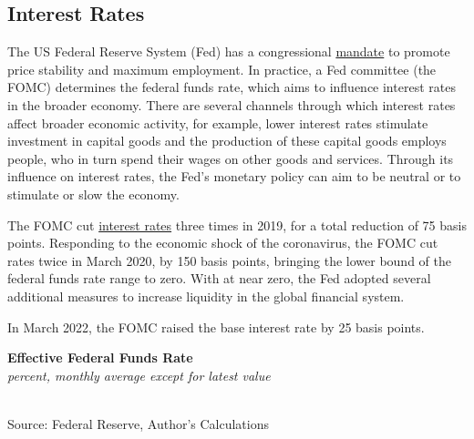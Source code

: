 \documentclass{report}
\makeatletter
\newcommand{\tbllink}[1]{\href{https://raw.githubusercontent.com/bdecon/US-chartbook/master/chartbook/data/#1}{\faTable}}
\newcommand*\short[1]{\expandafter\@gobbletwo\number\numexpr#1\relax}
\newcommand{\absnode}[3]{\node[below right, align=left] at (axis cs: #1,#2) {#3};}
\newcommand{\dateaxisticks}{
		date coordinates in=x, axis line style={draw=none},
		xmax={2022-03-15},
		max space between ticks=40,	    
		xtick={{1990-01-01}, {1992-01-01}, {1994-01-01}, 
			{1996-01-01}, {1998-01-01}, {2000-01-01}, 
			{2002-01-01}, {2004-01-01}, {2006-01-01},
			{2008-01-01}, {2010-01-01}, {2012-01-01}, {2014-01-01},
		    {2016-01-01}, {2018-01-01}, {2020-01-01}, {2022-01-01}, 
		    {2024-01-01}, {2026-01-01}},
		minor xtick={{1989-01-01}, {1991-01-01}, {1993-01-01},
			{1995-01-01}, {1997-01-01}, {1999-01-01}, 
			{2001-01-01}, {2003-01-01}, {2005-01-01}, {2007-01-01},
		    {2009-01-01}, {2011-01-01}, {2013-01-01}, {2015-01-01},
		    {2017-01-01}, {2019-01-01}, {2021-01-01}, {2023-01-01}, 
		    {2025-01-01}, {2027-01-01}},
		enlarge y limits={0.06}, enlarge x limits={0.01},
		}
\newcommand{\bbar}[2]{extra #1 ticks = {{#2}}, extra #1 tick labels = ,
		extra #1 tick style = {grid=major, grid style={thick, black!25}},}
\newcommand{\stdline}[4]{\addplot[very thick, no markers, color=#1] 
		table [x=#2, y=#3, col sep=comma] {#4};	}
\newcommand{\thickline}[4]{\addplot[ultra thick, no markers, color=#1] 
		table [x=#2, y=#3, col sep=comma] {#4};	}
\newcommand{\rbars}{
		\fill[color=black!10] (axis cs:{1990-07-01},\pgfkeysvalueof{/pgfplots/ymin}) rectangle 
			(axis cs:{1991-03-01}, \pgfkeysvalueof{/pgfplots/ymax});
		\fill[color=black!10] (axis cs:{2007-12-01},\pgfkeysvalueof{/pgfplots/ymin}) rectangle 
			(axis cs:{2009-07-01}, \pgfkeysvalueof{/pgfplots/ymax});
		\fill[color=black!10] (axis cs:{2001-03-01},\pgfkeysvalueof{/pgfplots/ymin}) rectangle 
			(axis cs:{2001-11-01}, \pgfkeysvalueof{/pgfplots/ymax});
		\fill[color=black!10] (axis cs:{2020-02-01},\pgfkeysvalueof{/pgfplots/ymin}) rectangle 
			(axis cs:{2020-05-01}, \pgfkeysvalueof{/pgfplots/ymax});}
\makeatother
\begin{document}
{{\begin{minipage}{0.76\textwidth}
\subsection*{Interest Rates}
\hypertarget{capint}{}
\small The US Federal Reserve System (Fed) has a congressional \href{https://www.federalreserve.gov/faqs/money_12848.htm}{mandate} to promote price stability and maximum employment. In practice, a Fed committee (the FOMC) determines the federal funds rate, which aims to influence interest rates in the broader economy. There are several channels through which interest rates affect broader economic activity, for example, lower interest rates stimulate investment in capital goods and the production of these capital goods employs people, who in turn spend their wages on other goods and services. Through its influence on interest rates, the Fed's monetary policy can aim to be neutral or to stimulate or slow the economy.

The FOMC cut \href{https://www.federalreserve.gov/releases/h15/}{interest rates} three times in 2019, for a total reduction of 75 basis points. Responding to the economic shock of the coronavirus, the FOMC cut rates twice in March 2020, by 150 basis points, bringing the lower bound of the federal funds rate range to zero. With at near zero, the Fed adopted several additional measures to increase liquidity in the global financial system.

In March 2022, the FOMC raised the base interest rate by 25 basis points. 
\vspace{2mm}

\normalsize \textbf{Effective Federal Funds Rate}\\
\footnotesize{\textit{percent, monthly average except for latest value }}\\
\hspace*{-2mm} \\
\footnotesize{Source: Federal Reserve, Author's Calculations} \hfill \tbllink{rates.csv}
\vspace{2mm}


\end{minipage}}}
\end{document}

